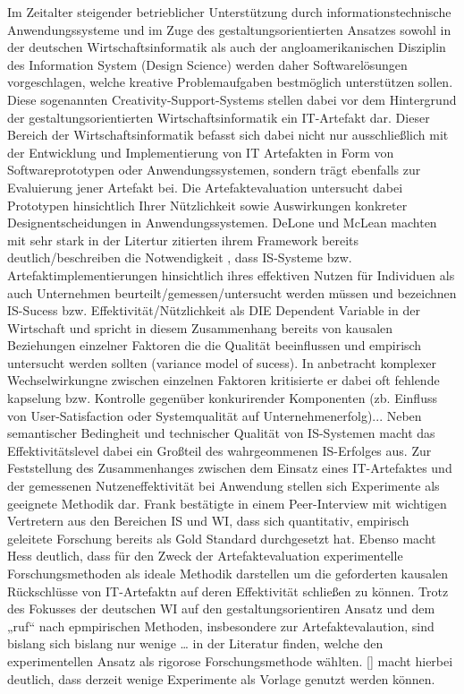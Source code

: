 Im Zeitalter steigender betrieblicher Unterstützung durch informationstechnische Anwendungssysteme und im Zuge des gestaltungsorientierten Ansatzes sowohl in der deutschen Wirtschaftsinformatik als auch der angloamerikanischen Disziplin des Information System (Design Science) werden daher Softwarelösungen vorgeschlagen, welche kreative Problemaufgaben bestmöglich unterstützen sollen. Diese sogenannten Creativity-Support-Systems stellen dabei vor dem Hintergrund der gestaltungsorientierten Wirtschaftsinformatik ein IT-Artefakt dar. Dieser Bereich der Wirtschaftsinformatik befasst sich dabei nicht nur ausschließlich mit der Entwicklung und Implementierung von IT Artefakten in Form von Softwareprototypen oder Anwendungssystemen, sondern trägt ebenfalls zur Evaluierung jener Artefakt bei. Die Artefaktevaluation untersucht dabei Prototypen hinsichtlich Ihrer Nützlichkeit sowie Auswirkungen konkreter Designentscheidungen in Anwendungssystemen. DeLone und McLean machten mit sehr stark in der Litertur zitierten ihrem Framework bereits deutlich/beschreiben die Notwendigkeit , dass IS-Systeme bzw. Artefaktimplementierungen hinsichtlich ihres effektiven Nutzen für Individuen als auch Unternehmen beurteilt/gemessen/untersucht werden müssen und bezeichnen IS-Sucess bzw. Effektivität/Nützlichkeit als DIE Dependent Variable in der Wirtschaft und spricht in diesem Zusammenhang bereits von kausalen Beziehungen einzelner Faktoren die die Qualität beeinflussen und empirisch untersucht werden sollten (variance model of sucess). In anbetracht komplexer Wechselwirkungne zwischen einzelnen Faktoren kritisierte er dabei oft fehlende kapselung bzw. Kontrolle gegenüber konkurirender Komponenten (zb. Einfluss von User-Satisfaction oder Systemqualität auf Unternehmenerfolg)... Neben semantischer Bedingheit und technischer Qualität von IS-Systemen macht das Effektivitätslevel dabei ein Großteil des wahrgeommenen IS-Erfolges aus. 
Zur Feststellung des Zusammenhanges zwischen dem Einsatz eines IT-Artefaktes und der gemessenen Nutzeneffektivität bei Anwendung stellen sich Experimente als geeignete Methodik dar. Frank bestätigte in einem Peer-Interview mit wichtigen Vertretern aus den Bereichen IS und WI, dass sich quantitativ, empirisch geleitete Forschung bereits als Gold Standard durchgesetzt hat. Ebenso macht Hess deutlich, dass für den Zweck der Artefaktevaluation experimentelle Forschungsmethoden als ideale Methodik darstellen um die geforderten kausalen Rückschlüsse von IT-Artefaktn auf deren Effektivität schließen zu können.
Trotz des Fokusses der deutschen WI auf den gestaltungsorientiren Ansatz und dem „ruf“ nach epmpirischen Methoden, insbesondere zur Artefaktevalaution, sind bislang sich bislang nur wenige … in der Literatur finden, welche den experimentellen Ansatz als rigorose Forschungsmethode wählten. [] macht hierbei deutlich, dass derzeit wenige Experimente als Vorlage genutzt werden können.
